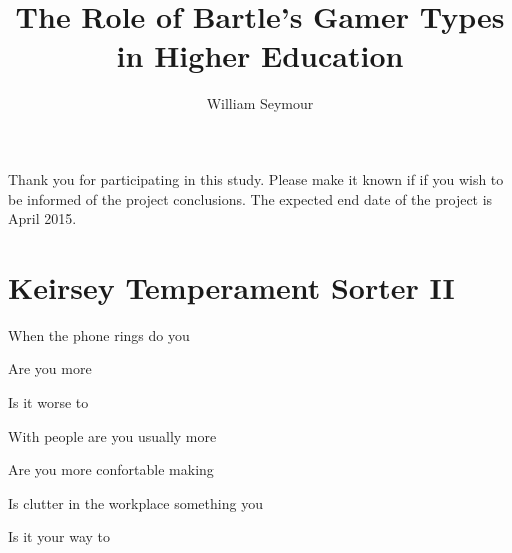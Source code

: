 \documentclass[english,pdf,pagemark,stamp,globalid=\candidateID,oneside,PrintQuestionnaireId=False]{sdaps}
\author{William Seymour}
\title{The Role of Bartle's Gamer Types in Higher Education}
\begin{document}
  \begin{questionnaire}
    \begin{info}
    	Thank you for participating in this study. Please make it known if if you wish to be informed of the project conclusions. The expected end date of the project is April 2015.
    \end{info}

    \section{Keirsey Temperament Sorter II}

\begin{multicols}{2}

\begin{choicequestion}[2]{When the phone rings do you}
\end{choicequestion}
    
\begin{choicequestion}[2]{Are you more}
\end{choicequestion}
    
\begin{choicequestion}[2]{Is it worse to}
    \end{choicequestion}

\begin{choicequestion}[2]{With people are you usually more}
\end{choicequestion}

\begin{choicequestion}[2]{Are you more confortable making}
\end{choicequestion}

\begin{choicequestion}[2]{Is clutter in the workplace something you}
\end{choicequestion}

\begin{choicequestion}[2]{Is it your way to}
\end{choicequestion}


\end{multicols}
\end{questionnaire}
\end{document}
